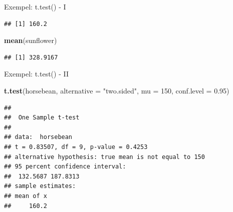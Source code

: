 \documentclass[
  11pt,
  ignorenonframetext,
  handout]{beamer}
\newenvironment{Shaded}{\begin{snugshade}}{\end{snugshade}}
\newcommand{\AttributeTok}[1]{\textcolor[rgb]{0.13,0.29,0.53}{#1}}
\newcommand{\DecValTok}[1]{\textcolor[rgb]{0.00,0.00,0.81}{#1}}
\newcommand{\FloatTok}[1]{\textcolor[rgb]{0.00,0.00,0.81}{#1}}
\newcommand{\FunctionTok}[1]{\textcolor[rgb]{0.13,0.29,0.53}{\textbf{#1}}}
\newcommand{\NormalTok}[1]{#1}
\newcommand{\OtherTok}[1]{\textcolor[rgb]{0.56,0.35,0.01}{#1}}
\newcommand{\SpecialCharTok}[1]{\textcolor[rgb]{0.81,0.36,0.00}{\textbf{#1}}}
\newcommand{\StringTok}[1]{\textcolor[rgb]{0.31,0.60,0.02}{#1}}
\begin{document}
\begin{frame}[fragile]{Exempel: t.test() - I}
\label{exempel-t.test---i}
\begin{Shaded}
\end{Shaded}

\begin{verbatim}
## [1] 160.2
\end{verbatim}

\begin{Shaded}
\begin{Highlighting}[]
\FunctionTok{mean}\NormalTok{(sunflower)}
\end{Highlighting}
\end{Shaded}

\begin{verbatim}
## [1] 328.9167
\end{verbatim}
\end{frame}

\begin{frame}[fragile]{Exempel: t.test() - II}
\label{exempel-t.test---ii}
\begin{Shaded}
\begin{Highlighting}[]
\FunctionTok{t.test}\NormalTok{(horsebean, }\AttributeTok{alternative =} \StringTok{"two.sided"}\NormalTok{,}
       \AttributeTok{mu =} \DecValTok{150}\NormalTok{, }\AttributeTok{conf.level =} \FloatTok{0.95}\NormalTok{)}
\end{Highlighting}
\end{Shaded}

\begin{verbatim}
## 
##  One Sample t-test
## 
## data:  horsebean
## t = 0.83507, df = 9, p-value = 0.4253
## alternative hypothesis: true mean is not equal to 150
## 95 percent confidence interval:
##  132.5687 187.8313
## sample estimates:
## mean of x 
##     160.2
\end{verbatim}
\end{frame}
\end{document}

